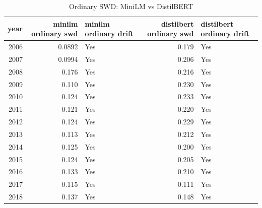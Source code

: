 \begin{table}[ht]
\centering
\caption{Ordinary SWD: MiniLM vs DistilBERT}
\label{tab:minilm_vs_distilbert_ordinary_swd}
\begin{tabular}{rrlrl}
\toprule
year & minilm ordinary swd & minilm ordinary drift & distilbert ordinary swd & distilbert ordinary drift \\
\midrule
2006 & 0.0892 & Yes & 0.179 & Yes \\
2007 & 0.0994 & Yes & 0.206 & Yes \\
2008 & 0.176 & Yes & 0.216 & Yes \\
2009 & 0.110 & Yes & 0.230 & Yes \\
2010 & 0.124 & Yes & 0.233 & Yes \\
2011 & 0.121 & Yes & 0.220 & Yes \\
2012 & 0.124 & Yes & 0.229 & Yes \\
2013 & 0.113 & Yes & 0.212 & Yes \\
2014 & 0.125 & Yes & 0.200 & Yes \\
2015 & 0.124 & Yes & 0.205 & Yes \\
2016 & 0.133 & Yes & 0.210 & Yes \\
2017 & 0.115 & Yes & 0.111 & Yes \\
2018 & 0.137 & Yes & 0.148 & Yes \\
\bottomrule
\end{tabular}
\end{table}
